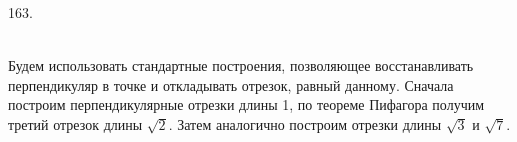 163. \begin{figure}[ht!]
\end{figure}\\
Будем использовать стандартные построения, позволяющее восстанавливать перпендикуляр в точке и откладывать отрезок, равный данному. Сначала построим перпендикулярные отрезки длины 1, по теореме Пифагора получим третий отрезок длины $\sqrt{2}.$ Затем аналогично построим отрезки длины $\sqrt{3}$ и $\sqrt{7}.$\newpage\noindent

